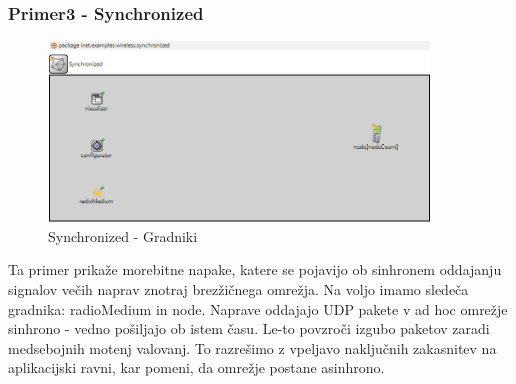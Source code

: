 \documentclass[11pt,a4paper,slovene]{myarticle}
\begin{document}
\subsubsection{Primer3 - Synchronized}
\begin{figure}[h!]
	\centering
		\includegraphics[width=0.9\textwidth, keepaspectratio=true]{./images/syn-components.png}
	\caption{Synchronized - Gradniki}
	\label{fig:synchronizedgradniki}
\end{figure}
Ta primer prikaže morebitne napake, katere se pojavijo ob sinhronem oddajanju signalov večih naprav znotraj brezžičnega omrežja. Na voljo imamo sledeča gradnika: radioMedium in node. Naprave oddajajo UDP pakete v ad hoc omrežje sinhrono - vedno pošiljajo ob istem času. Le-to povzroči izgubo paketov zaradi medsebojnih motenj valovanj. To razrešimo z vpeljavo naključnih zakasnitev na aplikacijski ravni, kar pomeni, da omrežje postane asinhrono.
\end{document}
